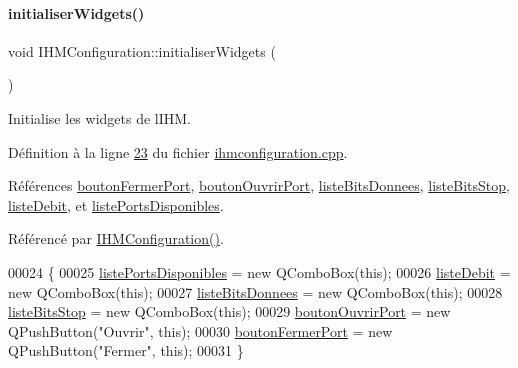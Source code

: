 \paragraph{\texorpdfstring{initialiser\+Widgets()}{initialiserWidgets()}}
{\footnotesize\ttfamily void I\+H\+M\+Configuration\+::initialiser\+Widgets (\begin{DoxyParamCaption}{ }\end{DoxyParamCaption})\hspace{0.3cm}{\ttfamily [private]}}



Initialise les widgets de l\textquotesingle{}I\+HM. 



Définition à la ligne \hyperlink{ihmconfiguration_8cpp_source_l00023}{23} du fichier \hyperlink{ihmconfiguration_8cpp_source}{ihmconfiguration.\+cpp}.



Références \hyperlink{ihmconfiguration_8h_source_l00030}{bouton\+Fermer\+Port}, \hyperlink{ihmconfiguration_8h_source_l00029}{bouton\+Ouvrir\+Port}, \hyperlink{ihmconfiguration_8h_source_l00027}{liste\+Bits\+Donnees}, \hyperlink{ihmconfiguration_8h_source_l00028}{liste\+Bits\+Stop}, \hyperlink{ihmconfiguration_8h_source_l00026}{liste\+Debit}, et \hyperlink{ihmconfiguration_8h_source_l00025}{liste\+Ports\+Disponibles}.



Référencé par \hyperlink{ihmconfiguration_8cpp_source_l00009}{I\+H\+M\+Configuration()}.


\begin{DoxyCode}
00024 \{
00025     \hyperlink{class_i_h_m_configuration_af3ce74444e24237aedf1d2ef2053b574}{listePortsDisponibles} = \textcolor{keyword}{new} QComboBox(\textcolor{keyword}{this});
00026     \hyperlink{class_i_h_m_configuration_a98e8133a04509b3a80b232d2f031e81f}{listeDebit} = \textcolor{keyword}{new} QComboBox(\textcolor{keyword}{this});
00027     \hyperlink{class_i_h_m_configuration_a83c61d075d53758bd753aada9a0bb452}{listeBitsDonnees} = \textcolor{keyword}{new} QComboBox(\textcolor{keyword}{this});
00028     \hyperlink{class_i_h_m_configuration_a16ae724388b797983c78e87e7d5485cb}{listeBitsStop} = \textcolor{keyword}{new} QComboBox(\textcolor{keyword}{this});
00029     \hyperlink{class_i_h_m_configuration_a824b7f6c0d332b8f6f76801e545b14ad}{boutonOuvrirPort} = \textcolor{keyword}{new} QPushButton(\textcolor{stringliteral}{"Ouvrir"}, \textcolor{keyword}{this});
00030     \hyperlink{class_i_h_m_configuration_a25c0b3c51a8d162ae3439a56ec644909}{boutonFermerPort} = \textcolor{keyword}{new} QPushButton(\textcolor{stringliteral}{"Fermer"}, \textcolor{keyword}{this});
00031 \}
\end{DoxyCode}


